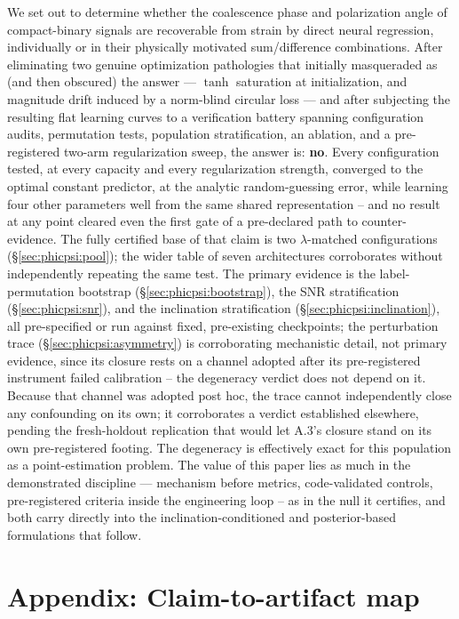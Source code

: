\documentclass[11pt]{article}
\begin{document}
We set out to determine whether the coalescence phase and polarization angle of compact-binary signals are recoverable from strain by direct neural regression, individually or in their physically motivated sum/difference combinations.
After eliminating two genuine optimization pathologies that initially masqueraded as (and then obscured) the answer --- $\tanh$ saturation at initialization, and magnitude drift induced by a norm-blind circular loss --- and after subjecting the resulting flat learning curves to a verification battery spanning configuration audits, permutation tests, population stratification, an ablation, and a pre-registered two-arm regularization sweep, the answer is: \textbf{no}.
Every configuration tested, at every capacity and every regularization strength, converged to the optimal constant predictor, at the analytic random-guessing error, while learning four other parameters well from the same shared representation – and no result at any point cleared even the first gate of a pre-declared path to counter-evidence.
The fully certified base of that claim is two $\lambda$-matched configurations (\S\ref{sec:phicpsi:pool}); the wider table of seven architectures corroborates without independently repeating the same test.
The primary evidence is the label-permutation bootstrap (\S\ref{sec:phicpsi:bootstrap}), the SNR stratification (\S\ref{sec:phicpsi:snr}), and the inclination stratification (\S\ref{sec:phicpsi:inclination}), all pre-specified or run against fixed, pre-existing checkpoints; the perturbation trace (\S\ref{sec:phicpsi:asymmetry}) is corroborating mechanistic detail, not primary evidence, since its closure rests on a channel adopted after its pre-registered instrument failed calibration – the degeneracy verdict does not depend on it.
Because that channel was adopted post hoc, the trace cannot independently close any confounding on its own; it corroborates a verdict established elsewhere, pending the fresh-holdout replication that would let A.3's closure stand on its own pre-registered footing.
The degeneracy is effectively exact for this population as a point-estimation problem.
The value of this paper lies as much in the demonstrated discipline --- mechanism before metrics, code-validated controls, pre-registered criteria inside the engineering loop – as in the null it certifies, and both carry directly into the inclination-conditioned and posterior-based formulations that follow.


\section*{Appendix: Claim-to-artifact map}
\label{sec:phicpsi:appendix}

\end{document}

